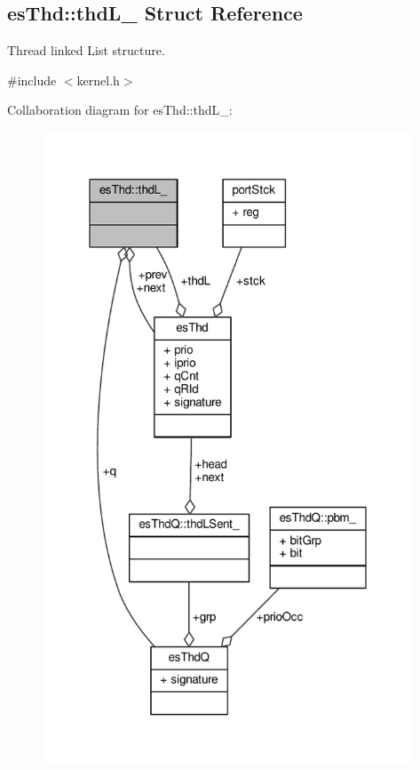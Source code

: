 \hypertarget{structesThd_1_1thdL__}{\subsection{es\-Thd\-:\-:thd\-L\-\_\- Struct Reference}
\label{structesThd_1_1thdL__}
}


Thread linked List structure.  




{\ttfamily \#include $<$kernel.\-h$>$}



Collaboration diagram for es\-Thd\-:\-:thd\-L\-\_\-\-:\nopagebreak
\begin{figure}[H]
\begin{center}
\leavevmode
\includegraphics[width=313pt]{structesThd_1_1thdL____coll__graph}
\end{center}
\end{figure}
